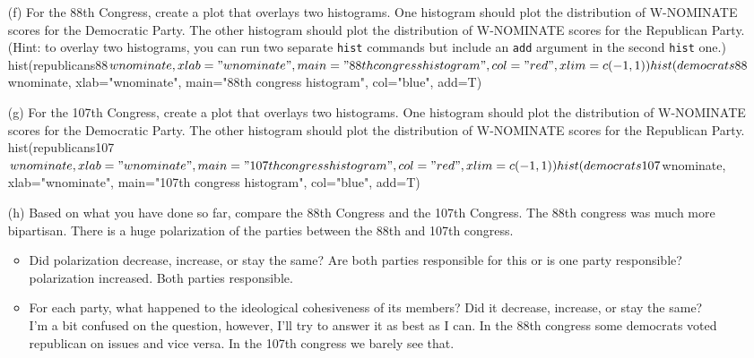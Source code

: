 \documentclass[12pt,letterpaper]{article}
\begin{document}
\begin{itemize}
\item[(f)] For the 88th Congress, create a plot that overlays two histograms. One histogram should plot the distribution of W-NOMINATE scores for the Democratic Party. The other histogram should plot the distribution of W-NOMINATE scores for the Republican Party. (Hint: to overlay two histograms, you can run two separate \texttt{hist} commands but include an \texttt{add} argument in the second \texttt{hist} one.) \\

hist(republicans88$wnominate, xlab = "wnominate", main="88th congress histogram", col="red", xlim=c(-1,1))
hist(democrats88$wnominate, xlab="wnominate", main="88th congress histogram", col="blue", add=T)

\item[(g)]  
For the 107th Congress, create a plot that overlays two histograms. One histogram should plot the distribution of W-NOMINATE scores for the Democratic Party. The other histogram should plot the distribution of W-NOMINATE scores for the Republican Party. \\
hist(republicans107$wnominate, xlab="wnominate", main="107th congress histogram", col="red",xlim=c(-1,1))
 hist(democrats107$wnominate, xlab="wnominate", main="107th congress histogram", col="blue", add=T)

\item[(h)] 
Based on what you have done so far, compare the 88th Congress and the 107th Congress.
The 88th congress was much more bipartisan. There is a huge polarization of the parties between the 88th and 107th congress.


\begin{itemize}
\item Did polarization decrease, increase, or stay the same? Are both parties responsible for this or is one party responsible? \\
polarization increased. Both parties responsible.


\item For each party, what happened to the ideological cohesiveness of its members? Did it decrease, increase, or stay the same?\\
I'm a bit confused on the question, however, I'll try to answer it as best as I can. In the 88th congress some democrats voted republican on issues and vice versa. In the 107th congress we barely see that.


\end{itemize}



\end{itemize}
\end{document}
